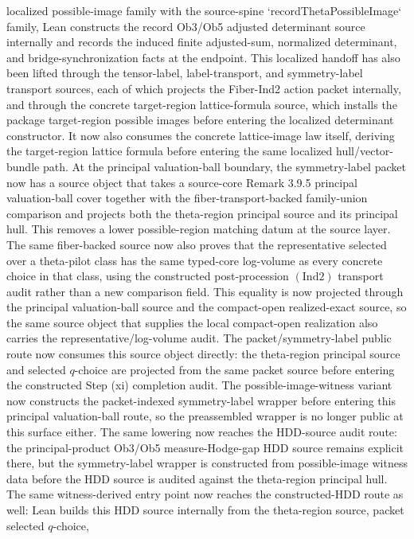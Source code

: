 \documentclass[11pt]{article}
\theoremstyle{plain}
\theoremstyle{definition}
\theoremstyle{remark}
\begin{document}
localized possible-image family with the source-spine
`recordThetaPossibleImage` family, Lean constructs the record Ob3/Ob5 adjusted
determinant source internally and records the induced finite adjusted-sum,
normalized determinant, and bridge-synchronization facts at the endpoint.
This localized handoff has also been lifted through the tensor-label,
label-transport, and symmetry-label transport sources, each of which projects
the Fiber-Ind2 action packet internally, and through the concrete target-region
lattice-formula source, which installs the package target-region possible
images before entering the localized determinant constructor.  It now also
consumes the concrete lattice-image law itself, deriving the target-region
lattice formula before entering the same localized hull/vector-bundle path.
At the principal valuation-ball boundary, the symmetry-label packet now has a
source object that takes a source-core Remark 3.9.5 principal valuation-ball
cover together with the fiber-transport-backed family-union comparison and
projects both the theta-region principal source and its principal hull.  This
removes a lower possible-region matching datum at the source layer.  The same
fiber-backed source now also proves that the representative selected over a
theta-pilot class has the same typed-core log-volume as every concrete choice
in that class, using the constructed post-procession \((\mathrm{Ind}2)\)
transport audit rather than a new comparison field.  This equality is now
projected through the principal valuation-ball source and the compact-open
realized-exact source, so the same source object that supplies the local
compact-open realization also carries the representative/log-volume audit.
The
packet/symmetry-label public route now consumes this source object directly:
the theta-region principal source and selected \(q\)-choice are projected from
the same packet source before entering the constructed Step (xi) completion
audit.  The possible-image-witness variant now constructs the packet-indexed
symmetry-label wrapper before entering this principal valuation-ball route, so
the preassembled wrapper is no longer public at this surface either.  The same
lowering now reaches the HDD-source audit route: the principal-product Ob3/Ob5
measure-Hodge-gap HDD source remains explicit there, but the symmetry-label
wrapper is constructed from possible-image witness data before the HDD source
is audited against the theta-region principal hull.  The same witness-derived
entry point now reaches the constructed-HDD route as well: Lean builds this HDD
source internally from the theta-region source, packet selected \(q\)-choice,
\end{document}

